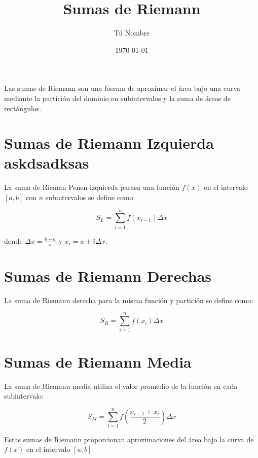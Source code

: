 \documentclass{article}
\begin{document}
\title{Sumas de Riemann}
\author{Tú Nombre}
\date{\today}
\maketitle

Las sumas de Riemann son una fosrma de aproximar el área bajo una curva mediante la partición del dominio en subintervalos y la suma de áreas de rectángulos.

\section{Sumas de Riemann Izquierda askdsadksas}

La suma de Rieman Penen izquierda parasa una función $f(x)$ en el intervalo $[a, b]$ con $n$ subintervalos se define como:

\[
S_L = \sum_{i=1}^{n} f(x_{i-1}) \Delta x
\]

donde $\Delta x = \frac{b-a}{n}$ y $x_i = a + i \Delta x$.

\section{Sumas de Riemann Derechas}

La suma de Riemann derecha para la misma función y partición se define como:

\[
S_R = \sum_{i=1}^{n} f(x_i) \Delta x
\]

\section{Sumas de Riemann Media}

La suma de Riemann media utiliza el valor promedio de la función en cada subintervalo:

\[
S_M = \sum_{i=1}^{n} f\left(\frac{x_{i-1}+x_i}{2}\right) \Delta x
\]

Estas sumas de Riemann proporcionan aproximaciones del área bajo la curva de $f(x)$ en el intervalo $[a, b]$.
\end{document}

